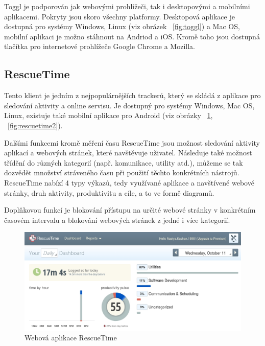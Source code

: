 \documentclass[thesis=B,czech]{FITthesis}[2012/06/26]
\begin{document}
Toggl je podporován jak webovými prohlížeči, tak i desktopovými a mobilními aplikacemi. Pokryty jsou skoro všechny platformy. Desktopová aplikace je dostupná pro systémy Windows, Linux (viz obrázek ~\ref{fig:toggl}) a Mac OS, mobilní aplikaci je možno stáhnout na Andriod a iOS. Kromě toho jsou dostupná tlačítka pro internetové prohlížeče Google Chrome a Mozilla.
\newpage
\subsection{RescueTime}

Tento klient \cite{rescuetime} je jedním z nejpopulárnějších trackerů, který se skládá z aplikace pro sledování aktivity a online servisu. Je dostupný pro systémy Windows, Mac OS, Linux, existuje také mobilní aplikace pro Android (viz obrázky ~\ref{fig:rescuetime}, ~\ref{fig:rescuetime2}). \par
Dalšími funkcemi kromě měření času RescueTime jsou možnost sledování aktivity aplikací a webových stránek, které navštěvuje uživatel. Následuje také možnost třídění do různých kategorií (např. komunikace, utility atd.), můžeme se tak dozvědět množství stráveného času při použití těchto konkrétních nástrojů. RescueTime nabízí 4 typy výkazů, tedy využívané aplikace a navštívené webové stránky, druh aktivity, produktivitu a cíle, a to ve formě diagramů.
\par
Doplňkovou funkcí je blokování přístupu na určité webové stránky v konkrétním časovém intervalu a blokování webových stránek z jedné i více kategorií. 

\begin{figure}[h]\centering
	\includegraphics[width=1\textwidth]{rescuetime.jpg}
	\caption[Webová aplikace RescueTime]{Webová aplikace RescueTime}\label{fig:rescuetime}
\end{figure}
\end{document}
